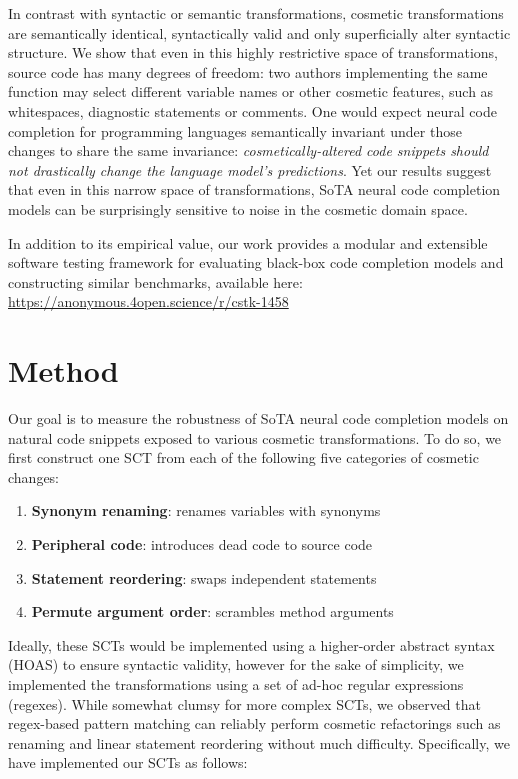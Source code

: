 \documentclass[usenames,dvipsnames]{article} %
\begin{document}
In contrast with syntactic or semantic transformations, cosmetic transformations are semantically identical, syntactically valid and only superficially alter syntactic structure. We show that even in this highly restrictive space of transformations, source code has many degrees of freedom: two authors implementing the same function may select different variable names or other cosmetic features, such as whitespaces, diagnostic statements or comments. One would expect neural code completion for programming languages semantically invariant under those changes to share the same invariance: \textit{cosmetically-altered code snippets should not drastically change the language model's predictions}. Yet our results suggest that even in this narrow space of transformations, SoTA neural code completion models can be surprisingly sensitive to noise in the cosmetic domain space.

In addition to its empirical value, our work provides a modular and extensible software testing framework for evaluating black-box code completion models and constructing similar benchmarks, available here: \url{https://anonymous.4open.science/r/cstk-1458}

\section{Method}

Our goal is to measure the robustness of SoTA neural code completion models on natural code snippets exposed to various cosmetic transformations. To do so, we first construct one SCT from each of the following five categories of cosmetic changes:

\begin{enumerate}[itemsep=1ex]
  \item \textbf{Synonym renaming}: renames variables with synonyms
  \item \textbf{Peripheral code}: introduces dead code to source code
  \item \textbf{Statement reordering}: swaps independent statements
  \item \textbf{Permute argument order}: scrambles method arguments
\end{enumerate}

Ideally, these SCTs would be implemented using a higher-order abstract syntax (HOAS) to ensure syntactic validity, however for the sake of simplicity, we implemented the transformations using a set of ad-hoc regular expressions (regexes). While somewhat clumsy for more complex SCTs, we observed that regex-based pattern matching can reliably perform cosmetic refactorings such as renaming and linear statement reordering without much difficulty. Specifically, we have implemented our SCTs as follows:
\end{document}

